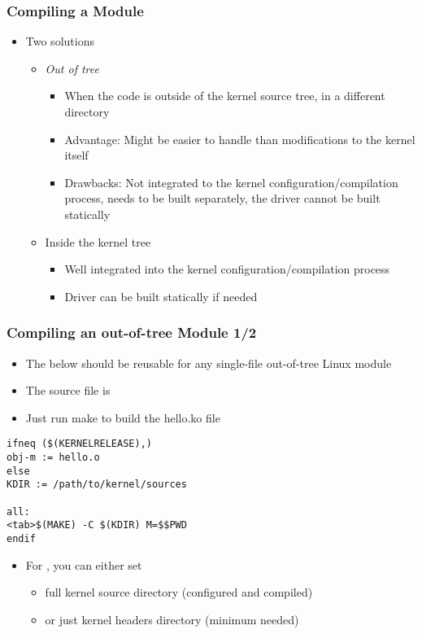 \begin{frame}
  \frametitle{Compiling a Module}
  \begin{itemize}
  \item Two solutions
    \begin{itemize}
    \item \emph{Out of tree}
      \begin{itemize}
      \item When the code is outside of the kernel source tree, in a
        different directory
      \item Advantage: Might be easier to handle than modifications to
        the kernel itself
      \item Drawbacks: Not integrated to the kernel
        configuration/compilation process, needs to be built
        separately, the driver cannot be built statically
      \end{itemize}
    \item Inside the kernel tree
      \begin{itemize}
      \item Well integrated into the kernel configuration/compilation
        process
      \item Driver can be built statically if needed
      \end{itemize}
    \end{itemize}
  \end{itemize}
\end{frame}

\begin{frame}[fragile]
  \frametitle{Compiling an out-of-tree Module 1/2}
  \begin{itemize}
  \item The below  should be reusable for any single-file
    out-of-tree Linux module
  \item The source file is 
  \item Just run make to build the hello.ko file
  \end{itemize}
\begin{verbatim}
ifneq ($(KERNELRELEASE),)
obj-m := hello.o
else
KDIR := /path/to/kernel/sources

all:
<tab>$(MAKE) -C $(KDIR) M=$$PWD
endif
\end{verbatim}

\begin{itemize}
\item For , you can either set
  \begin{itemize}
  \item full kernel source directory (configured and compiled)
  \item or just kernel headers directory (minimum needed)
  \end{itemize}
\end{itemize}
\end{frame}

